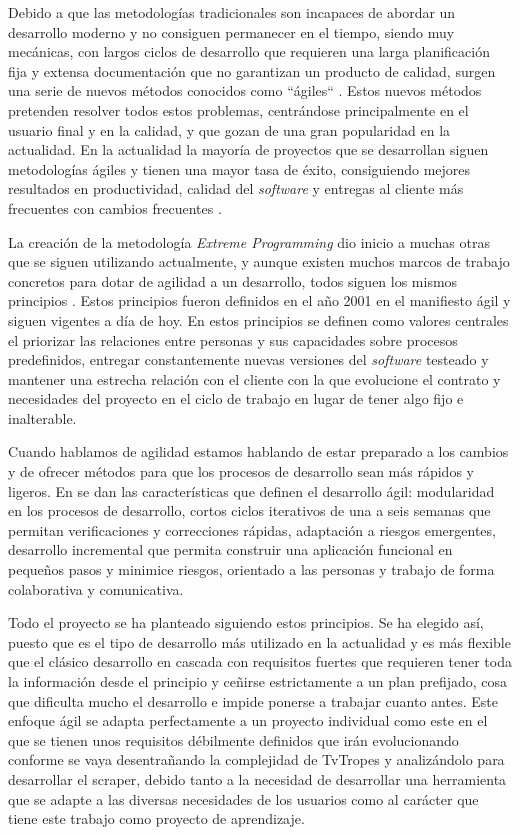 Debido a que las metodologías tradicionales son incapaces de abordar un
desarrollo moderno y no consiguen permanecer en el tiempo, siendo muy mecánicas,
con largos ciclos de desarrollo que requieren una larga planificación fija y
extensa documentación que no garantizan un producto de calidad, surgen una serie
de nuevos métodos conocidos como ``ágiles`` \cite{abrahamsson2017agile}. Estos
nuevos métodos pretenden resolver todos estos problemas, centrándose
principalmente en el usuario final y en la calidad, y que gozan de una gran
popularidad en la actualidad. En la actualidad la mayoría de proyectos que se
desarrollan siguen metodologías ágiles y tienen una mayor tasa de éxito,
consiguiendo mejores resultados en productividad, calidad del \textit{software}
y entregas al cliente más frecuentes con cambios frecuentes
\cite{agilestatistics}.

La creación de la metodología \textit{Extreme Programming} dio inicio a muchas
otras que se siguen utilizando actualmente, y aunque existen muchos marcos de
trabajo concretos para dotar de agilidad a un desarrollo, todos siguen los
mismos principios \cite{abrahamsson2017agile}. Estos principios fueron definidos
en el año 2001 en el manifiesto ágil \cite{agilemanifesto} y siguen vigentes a
día de hoy. En estos principios se definen como valores centrales el priorizar
las relaciones entre personas y sus capacidades sobre procesos predefinidos,
entregar constantemente nuevas versiones del \textit{software} testeado y
mantener una estrecha relación con el cliente con la que evolucione el contrato
y necesidades del proyecto en el ciclo de trabajo en lugar de tener algo fijo e
inalterable.

Cuando hablamos de agilidad estamos hablando de estar preparado a los cambios y
de ofrecer métodos para que los procesos de desarrollo sean más rápidos y
ligeros. En \cite{abrahamsson2017agile} se dan las características que definen
el desarrollo ágil: modularidad en los procesos de desarrollo, cortos ciclos
iterativos de una a seis semanas que permitan verificaciones y correcciones
rápidas, adaptación a riesgos emergentes, desarrollo incremental que permita
construir una aplicación funcional en pequeños pasos y minimice riesgos,
orientado a las personas y trabajo de forma colaborativa y comunicativa. 

Todo el proyecto se ha planteado siguiendo estos principios. Se ha elegido así,
puesto que es el tipo de desarrollo más utilizado en la actualidad y es más
flexible que el clásico desarrollo en cascada con requisitos fuertes que
requieren tener toda la información desde el principio y ceñirse estrictamente a
un plan prefijado, cosa que dificulta mucho el desarrollo e impide ponerse a
trabajar cuanto antes. Este enfoque ágil se adapta perfectamente a un proyecto
individual como este en el que se tienen unos requisitos débilmente definidos
que irán evolucionando conforme se vaya desentrañando la complejidad de TvTropes
y analizándolo para desarrollar el scraper, debido tanto a la necesidad de
desarrollar una herramienta que se adapte a las diversas necesidades de los
usuarios como al carácter que tiene este trabajo como proyecto de aprendizaje.

